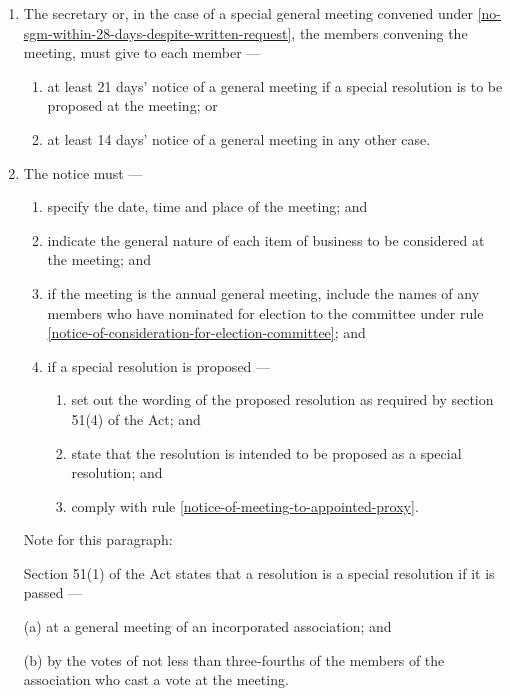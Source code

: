 \documentclass[../constitution.tex]{subfiles}
\begin{document}
\begin{enumerate}

\item The secretary or, in the case of a special general meeting convened under  \ref{no-sgm-within-28-days-despite-written-request}, the members convening the meeting, must give to each member ---

  \begin{enumerate}
  
  \item at least 21 days' notice of a general meeting if a special resolution is to be proposed at the meeting; or
  \item at least 14 days' notice of a general meeting in any other case.
  \end{enumerate}
\item The notice must ---

  \begin{enumerate}
  
  \item specify the date, time and place of the meeting; and
  \item indicate the general nature of each item of business to be considered at the meeting; and
  \item if the meeting is the annual general meeting, include the names of any members who have nominated for election to the committee under rule \ref{notice-of-consideration-for-election-committee}; and
  \item if a special resolution is proposed ---

    \begin{enumerate}
    
    \item set out the wording of the proposed resolution as required by section 51(4) of the Act; and
    \item state that the resolution is intended to be proposed as a special resolution; and
    \item comply with rule \ref{notice-of-meeting-to-appointed-proxy}.
    \end{enumerate}
  \end{enumerate}


  Note for this paragraph: 

  Section 51(1) of the Act states that a resolution is a special resolution if 
 it is passed — 

  (a) at a general meeting of an incorporated association; and 

  (b) by the votes of not less than three-fourths of the members of the association who cast a vote at the meeting. 

\end{enumerate}
\end{document}
